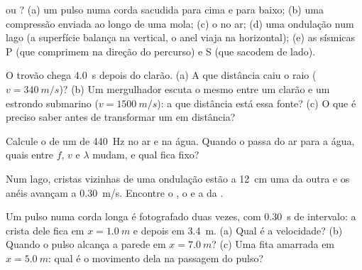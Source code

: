 \begin{exercise}[$\star$]\label{exo:g12:mechanical-waves:2}
 ou ? (a) um pulso numa corda sacudida para cima e
para baixo; (b) uma compressão enviada ao longo de uma mola; (c) o  no
ar; (d) uma ondulação num lago (a superfície balança na vertical, o anel
viaja na horizontal); (e) as  sísmicas P (que comprimem na direção
do percurso) e S (que sacodem de lado).
\end{exercise}

\begin{exercise}[$\star$]\label{exo:g12:mechanical-waves:3}
O trovão chega \qty{4.0}{s} depois do clarão. (a) A que distância caiu o
raio ($v = \qty{340}{m/s}$)? (b) Um mergulhador escuta o mesmo 
entre um clarão e um estrondo submarino ($v = \qty{1500}{m/s}$): a que
distância está essa fonte? (c) O que é preciso saber antes de transformar
um  em distância?
\end{exercise}

\begin{exercise}[$\star$]\label{exo:g12:mechanical-waves:4}
Calcule o  de um  de \qty{440}{Hz} no ar e na água.
Quando o  passa do ar para a água, quais entre $f$, $v$ e $\lambda$
mudam, e qual fica fixo?
\end{exercise}

\begin{exercise}[$\star$]\label{exo:g12:mechanical-waves:5}
Num lago, cristas vizinhas de uma ondulação estão a \qty{12}{cm} uma da
outra e os anéis avançam a \qty{0.30}{m/s}. Encontre o , o  e a  da .
\end{exercise}

\begin{exercise}[$\star\star$]\label{exo:g12:mechanical-waves:6}
Um pulso numa corda longa é fotografado duas vezes, com \qty{0.30}{s} de
intervalo: a crista dele fica em $x = \qty{1.0}{m}$ e depois em
\qty{3.4}{m}. (a) Qual é a velocidade? (b) Quando o pulso alcança a
parede em $x = \qty{7.0}{m}$? (c) Uma fita amarrada em
$x = \qty{5.0}{m}$: qual é o movimento dela na passagem do pulso?
\end{exercise}

